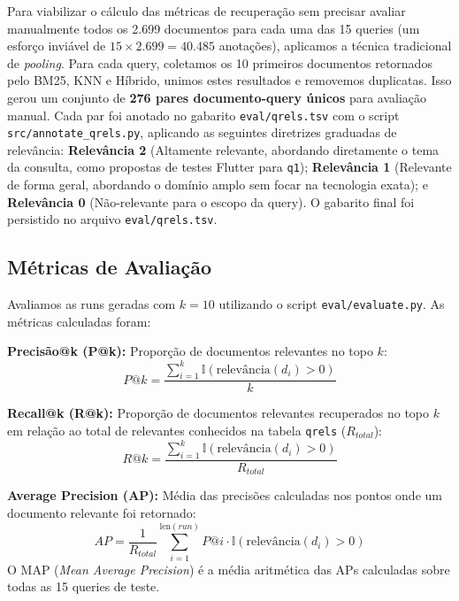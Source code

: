 \documentclass[12pt]{article}
\begin{document}
Para viabilizar o cálculo das métricas de recuperação sem precisar avaliar manualmente todos os 2.699 documentos para cada uma das 15 queries (um esforço inviável de $15 \times 2.699 = 40.485$ anotações), aplicamos a técnica tradicional de \textit{pooling}. Para cada query, coletamos os 10 primeiros documentos retornados pelo BM25, KNN e Híbrido, unimos estes resultados e removemos duplicatas. Isso gerou um conjunto de \textbf{276 pares documento-query únicos} para avaliação manual. Cada par foi anotado no gabarito \texttt{eval/qrels.tsv} com o script \texttt{src/annotate\_qrels.py}, aplicando as seguintes diretrizes graduadas de relevância: \textbf{Relevância 2} (Altamente relevante, abordando diretamente o tema da consulta, como propostas de testes Flutter para \texttt{q1}); \textbf{Relevância 1} (Relevante de forma geral, abordando o domínio amplo sem focar na tecnologia exata); e \textbf{Relevância 0} (Não-relevante para o escopo da query). O gabarito final foi persistido no arquivo \texttt{eval/qrels.tsv}.

\subsection{Métricas de Avaliação}

Avaliamos as runs geradas com $k = 10$ utilizando o script \texttt{eval/evaluate.py}. As métricas calculadas foram:

\noindent\textbf{Precisão@k (P@k):} Proporção de documentos relevantes no topo $k$:
\begin{equation}
    P@k = \frac{\sum_{i=1}^{k} \mathbb{I}(\text{relevância}(d_i) > 0)}{k}
\end{equation}

\noindent\textbf{Recall@k (R@k):} Proporção de documentos relevantes recuperados no topo $k$ em relação ao total de relevantes conhecidos na tabela \texttt{qrels} ($R_{total}$):
\begin{equation}
    R@k = \frac{\sum_{i=1}^{k} \mathbb{I}(\text{relevância}(d_i) > 0)}{R_{total}}
\end{equation}

\noindent\textbf{Average Precision (AP):} Média das precisões calculadas nos pontos onde um documento relevante foi retornado:
\begin{equation}
    AP = \frac{1}{R_{total}} \sum_{i=1}^{\text{len}(run)} P@i \cdot \mathbb{I}(\text{relevância}(d_i) > 0)
\end{equation}
O MAP (\textit{Mean Average Precision}) é a média aritmética das APs calculadas sobre todas as 15 queries de teste.
\end{document}
